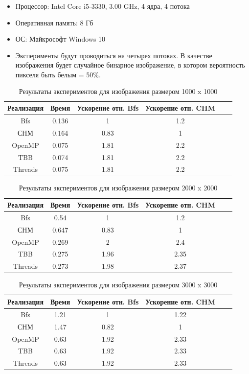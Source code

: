 \documentclass{report}
\begin{document}
\begin{itemize}
\item Процессор: Intel Core i5-3330, 3.00 GHz, 4 ядра, 4 потока
\item Оперативная память: 8 Гб
\item ОС: Майкрософт Windows 10
\item Эксперименты будут проводиться на четырех потоках. В качестве изображения будет случайное бинарное изображение, в котором вероятность пикселя быть белым = 50\%.
\end{itemize}
\begin{table}[H]
		\caption{Результаты экспериментов для изображения размером 1000 x 1000}
		\centering
		\begin{tabular}{|c|c|c|c|c|c|}
            \hline
			Реализация & Время & Ускорение отн. Bfs & Ускорение отн. CHM \\
            \hline
            Bfs & 0.136 & 1 & 1.2 \\
            СНМ & 0.164 & 0.83 & 1 \\
			OpenMP & 0.075 & 1.81 & 2.2 \\
			TBB & 0.074 & 1.81 & 2.2 \\
			Threads & 0.075 & 1.81 & 2.2  \\
            \hline
		\end{tabular}
\end{table}

\begin{table}[H]
		\caption{Результаты экспериментов для изображения размером 2000 x 2000}
		\centering
		\begin{tabular}{|c|c|c|c|c|c|}
            \hline
			Реализация & Время & Ускорение отн. Bfs & Ускорение отн. CHM \\
            \hline
            Bfs & 0.54 & 1 & 1.2 \\
            СНМ & 0.647 & 0.83 & 1 \\
			OpenMP & 0.269 & 2 & 2.4 \\
			TBB & 0.275 & 1.96 & 2.35 \\
			Threads & 0.273 & 1.98 & 2.37  \\
            \hline
		\end{tabular}
\end{table}

\begin{table}[H]
		\caption{Результаты экспериментов для изображения размером 3000 x 3000}
		\centering
		\begin{tabular}{|c|c|c|c|c|c|}
            \hline
			Реализация & Время & Ускорение отн. Bfs & Ускорение отн. CHM \\
            \hline
            Bfs & 1.21 & 1 & 1.22 \\
            СНМ & 1.47 & 0.82 & 1 \\
			OpenMP & 0.63 & 1.92 & 2.33 \\
			TBB & 0.63 & 1.92 & 2.33 \\
			Threads & 0.63 & 1.92 & 2.33  \\
            \hline
		\end{tabular}
\end{table}
\end{document}
